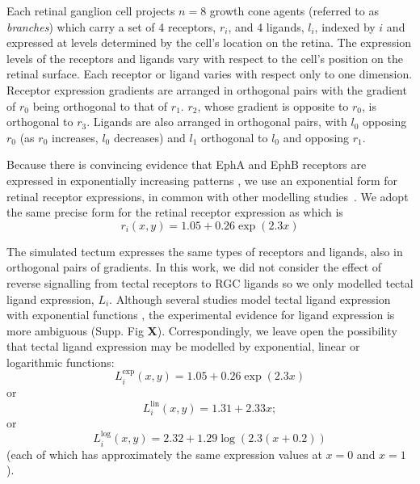 \documentclass[11pt, a4paper]{article}
\begin{document}
Each retinal ganglion cell projects $n=8$ growth cone agents (referred to
as \emph{branches}) which carry a set of 4 receptors, $r_i$, and 4 ligands,
$l_i$, indexed by $i$ and
expressed at levels determined by the cell's location on the retina. The
expression levels of the receptors and ligands vary with respect to the cell's
position on the retinal surface. Each receptor or ligand varies with respect
only to one dimension.  Receptor expression gradients are arranged in
orthogonal pairs with the gradient of $r_0$ being orthogonal to that of
$r_1$. $r_2$, whose gradient is opposite to $r_0$, is orthogonal to
$r_3$. Ligands are also arranged in orthogonal pairs, with $l_0$ opposing
$r_0$ (as $r_0$ increases, $l_0$ decreases) and $l_1$ orthogonal to $l_0$ and
opposing $r_1$.

Because there is convincing evidence that EphA and EphB receptors are
expressed in exponentially increasing
patterns \citep{reber_relative_2004,feldheim_genetic_2000,brown_topographic_2000,koulakov_stochastic_2004},
we use an exponential form for retinal receptor expressions, in common with
other modelling
studies~\citep{reber_relative_2004,koulakov_stochastic_2004,simpson_simple_2011}.
We adopt the same precise form for the retinal receptor expression
as \citet{simpson_simple_2011} which is
\begin{equation}
r_i(x,y) = 1.05 + 0.26 \exp(2.3 x)
\end{equation}

The simulated tectum expresses the same types of receptors and ligands, also
in orthogonal pairs of gradients. In this work, we did not consider the effect
of reverse signalling from tectal receptors to RGC ligands so we only modelled
tectal ligand expression, $L_i$. Although several studies model tectal ligand
expression with exponential functions \citep{koulakov_stochastic_2004}, the
experimental evidence for ligand expression is more ambiguous (Supp. Fig
\textbf{X}). Correspondingly, we leave open the possibility that tectal ligand
expression may be modelled by exponential, linear or logarithmic functions:
\begin{equation}
L_i^{\text{exp}}(x,y) = 1.05 + 0.26 \exp(2.3 x)
\end{equation}
or
\begin{equation}
L_i^{\text{lin}}(x,y) = 1.31 + 2.33 x;
\end{equation}
or
\begin{equation}
L_i^{\text{log}}(x,y) = 2.32 + 1.29 \log (2.3(x+0.2))
\end{equation}
(each of which has approximately the same expression values at $x=0$ and $x=1$).
\end{document}
